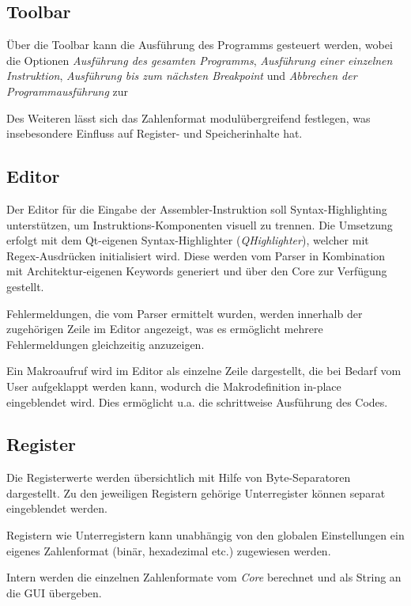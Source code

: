 \subsection{Toolbar}

Über die Toolbar kann die Ausführung des Programms gesteuert werden, wobei die Optionen \textit{Ausführung des gesamten Programms}, \textit{Ausführung einer einzelnen Instruktion}, \textit{Ausführung bis zum
  nächsten Breakpoint} und \textit{Abbrechen der Programmausführung} zur

Des Weiteren lässt sich das Zahlenformat modulübergreifend festlegen, was insebesondere Einfluss auf Register- und Speicherinhalte hat.

\subsection{Editor}

Der Editor für die Eingabe der Assembler-Instruktion soll Syntax-Highlighting unterstützen, um Instruktions-Komponenten visuell zu trennen. Die Umsetzung erfolgt mit dem Qt-eigenen Syntax-Highlighter (\textit{QHighlighter}), welcher mit Regex-Ausdrücken initialisiert wird. Diese werden vom Parser in Kombination mit Architektur-eigenen Keywords generiert und über den Core zur Verfügung gestellt.

Fehlermeldungen, die vom Parser ermittelt wurden, werden innerhalb der zugehörigen Zeile im Editor angezeigt, was es ermöglicht mehrere Fehlermeldungen gleichzeitig anzuzeigen.

Ein Makroaufruf wird im Editor als einzelne Zeile dargestellt, die bei Bedarf vom User aufgeklappt werden kann, wodurch die Makrodefinition in-place eingeblendet wird. Dies ermöglicht u.a. die schrittweise Ausführung des Codes.

\subsection{Register}

Die Registerwerte werden übersichtlich mit Hilfe von Byte-Separatoren dargestellt. Zu den jeweiligen Registern gehörige Unterregister können separat eingeblendet werden.

Registern wie Unterregistern kann unabhängig von den globalen Einstellungen ein eigenes Zahlenformat (binär, hexadezimal etc.) zugewiesen werden.

Intern werden die einzelnen Zahlenformate vom \textit{Core} berechnet und als String an die GUI übergeben.

